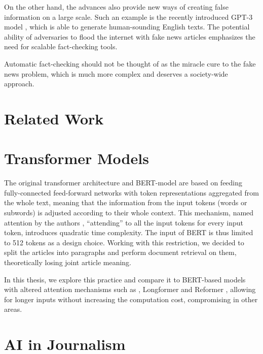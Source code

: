 On the other hand, the advances also provide new ways of creating false information on a large scale. Such an example is the recently introduced GPT-3 model \citep{gpt}, which is able to generate human-sounding English texts.
The potential ability of adversaries to flood the internet with fake news articles emphasizes the need for scalable fact-checking tools.

Automatic fact-checking should not be thought of as the miracle cure to the fake news problem, which is much more complex and deserves a society-wide approach.

\section*{Related Work}

\section*{Transformer Models}

The original transformer architecture \citep{attention-is-all-you-need} and BERT-model \citep{bert} are based on feeding fully-connected feed-forward networks with token representations aggregated from the whole text, meaning that the information from the input tokens (words or subwords) is adjusted according to their whole context. 
This mechanism, named attention by the authors \citep{attention-is-all-you-need}, ``attending'' to all the input tokens for every input token, introduces quadratic time complexity. 
The input of BERT is thus limited to 512 tokens as a design choice.
Working with this restriction, we decided to split the \CTK{} articles into paragraphs and perform document retrieval on them, theoretically losing joint article meaning.

In this thesis, we explore this practice and compare it to BERT-based models with altered attention mechanisms such as \nystr{} \citep{nystrom}, Longformer \citep{longformer} and Reformer \citep{reformer}, allowing for longer inputs without increasing the computation cost, compromising in other areas.

\section*{AI in Journalism}

